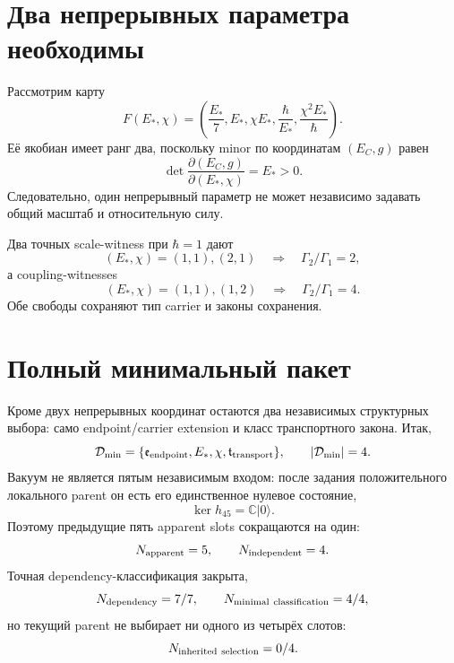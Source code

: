 \section{Два непрерывных параметра необходимы}

Рассмотрим карту
\begin{equation}
 F(E_*,\chi)=
 \left(\frac{E_*}{7},E_*,\chi E_*,
 \frac{\hbar}{E_*},\frac{\chi^2E_*}{\hbar}\right).
 \label{eq:v8-mediator-min-data-map}
\end{equation}
Её якобиан имеет ранг два, поскольку minor по координатам $(E_C,g)$ равен
\begin{equation}
 \det\frac{\partial(E_C,g)}{\partial(E_*,\chi)}=E_*>0.
 \label{eq:v8-mediator-min-data-jacobian-minor}
\end{equation}
Следовательно, один непрерывный параметр не может независимо задавать общий
масштаб и относительную силу.

Два точных scale-witness при $\hbar=1$ дают
\begin{equation}
 (E_*,\chi)=(1,1),(2,1)
 \quad\Longrightarrow\quad \Gamma_2/\Gamma_1=2,
 \label{eq:v8-mediator-min-data-scale-witness}
\end{equation}
а coupling-witnesses
\begin{equation}
 (E_*,\chi)=(1,1),(1,2)
 \quad\Longrightarrow\quad \Gamma_2/\Gamma_1=4.
 \label{eq:v8-mediator-min-data-coupling-witness}
\end{equation}
Обе свободы сохраняют тип carrier и законы сохранения.

\section{Полный минимальный пакет}

Кроме двух непрерывных координат остаются два независимых структурных
выбора: само endpoint/carrier extension и класс транспортного закона.
Итак,
\begin{equation}
 \mathcal D_{\min}=
 \{\mathfrak e_{\rm endpoint},E_*,\chi,\mathfrak t_{\rm transport}\},
 \qquad |\mathcal D_{\min}|=4.
 \label{eq:v8-mediator-min-data-package}
\end{equation}
Вакуум не является пятым независимым входом: после задания положительного
локального parent он есть его единственное нулевое состояние,
\begin{equation}
 \ker h_{45}=\mathbb C|0\rangle.
 \label{eq:v8-mediator-min-data-vacuum-derived}
\end{equation}
Поэтому предыдущие пять apparent slots сокращаются на один:
\begin{equation}
 N_{\rm apparent}=5,
 \qquad N_{\rm independent}=4.
 \label{eq:v8-mediator-min-data-reduction}
\end{equation}
Точная dependency-классификация закрыта,
\begin{equation}
 N_{\rm dependency}=7/7,
 \qquad N_{\rm minimal\ classification}=4/4,
 \label{eq:v8-mediator-min-data-ledgers}
\end{equation}
но текущий parent не выбирает ни одного из четырёх слотов:
\begin{equation}
 N_{\rm inherited\ selection}=0/4.
 \label{eq:v8-mediator-min-data-origin-ledger}
\end{equation}

